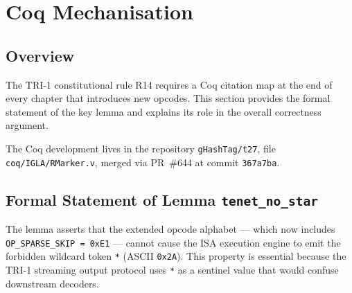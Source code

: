\section{Coq Mechanisation}
\label{sec:ch79-coq}

\subsection{Overview}
\label{subsec:ch79-coq-overview}

The TRI-1 constitutional rule R14 requires a Coq citation map at the
end of every chapter that introduces new opcodes.
This section provides the formal statement of the key lemma and
explains its role in the overall correctness argument.

The Coq development lives in the repository \texttt{gHashTag/t27},
file \texttt{coq/IGLA/RMarker.v}, merged via PR~\#644 at commit
\texttt{367a7ba}.

\subsection{Formal Statement of Lemma \texttt{tenet\_no\_star}}
\label{subsec:ch79-tenet-no-star}

The lemma asserts that the extended opcode alphabet — which now
includes \texttt{OP\_SPARSE\_SKIP = 0xE1} — cannot cause the
ISA execution engine to emit the forbidden wildcard token
\texttt{*} (ASCII \texttt{0x2A}).
This property is essential because the TRI-1 streaming output
protocol uses \texttt{*} as a sentinel value that would confuse
downstream decoders.

